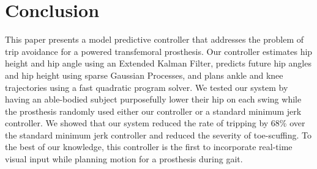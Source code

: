 \section{Conclusion} 
\label{sec:conclusion}
This paper presents a model predictive controller that addresses the
problem of trip avoidance for a powered transfemoral prosthesis. Our
controller estimates hip height and hip angle using an Extended
Kalman Filter, predicts future hip angles and hip height using
sparse Gaussian Processes, and plans ankle
and knee trajectories using a fast quadratic program solver. We
tested our system by having an able-bodied subject purposefully lower
their hip on each swing while the prosthesis randomly used either our
controller or a standard minimum jerk controller. We showed that our
system reduced the rate of tripping by 68\% over the standard minimum
jerk controller and reduced the severity of toe-scuffing. To the best
of our knowledge, this controller is the first to incorporate real-time
visual input while planning motion for a prosthesis during gait. 